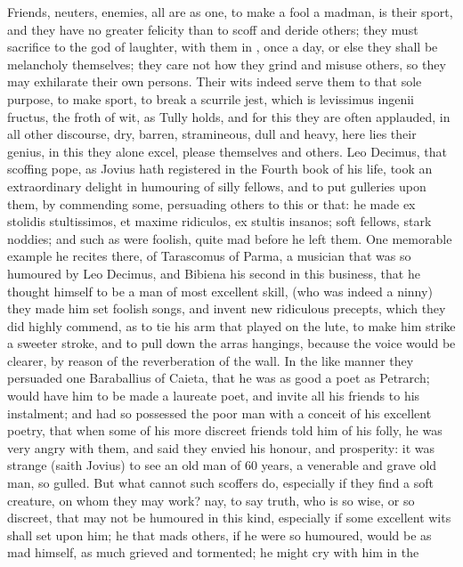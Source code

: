 {Friends, neuters, enemies, all are as one, to make a fool a madman, is
their sport, and they have no greater felicity than to scoff and deride
others; they must sacrifice to the god of laughter, with them in 
\Apuleius, once a day, or else they shall be melancholy themselves; they
care not how they grind and misuse others, so they may exhilarate their
own persons. Their wits indeed serve them to that sole purpose, to make
sport, to break a scurrile jest, which is levissimus ingenii fructus,
the froth of wit, as Tully holds, and for this they are often
applauded, in all other discourse, dry, barren, stramineous, dull and
heavy, here lies their genius, in this they alone excel, please
themselves and others. Leo Decimus, that scoffing pope, as Jovius hath
registered in the Fourth book of his life, took an extraordinary
delight in humouring of silly fellows, and to put gulleries upon them,
by commending some, persuading others to this or that: he made ex
stolidis stultissimos, et maxime ridiculos, ex stultis insanos; soft
fellows, stark noddies; and such as were foolish, quite mad before he
left them. One memorable example he recites there, of Tarascomus of
Parma, a musician that was so humoured by Leo Decimus, and Bibiena his
second in this business, that he thought himself to be a man of most
excellent skill, (who was indeed a ninny) they made him set
foolish songs, and invent new ridiculous precepts, which they did
highly commend, as to tie his arm that played on the lute, to make him
strike a sweeter stroke, and to pull down the arras hangings,
because the voice would be clearer, by reason of the reverberation of
the wall. In the like manner they persuaded one Baraballius of Caieta,
that he was as good a poet as Petrarch; would have him to be made a
laureate poet, and invite all his friends to his instalment; and had so
possessed the poor man with a conceit of his excellent poetry, that
when some of his more discreet friends told him of his folly, he was
very angry with them, and said they envied his honour, and
prosperity: it was strange (saith Jovius) to see an old man of 60
years, a venerable and grave old man, so gulled. But what cannot such
scoffers do, especially if they find a soft creature, on whom they may
work? nay, to say truth, who is so wise, or so discreet, that may not
be humoured in this kind, especially if some excellent wits shall set
upon him; he that mads others, if he were so humoured, would be as mad
himself, as much grieved and tormented; he might cry with him in the
}
